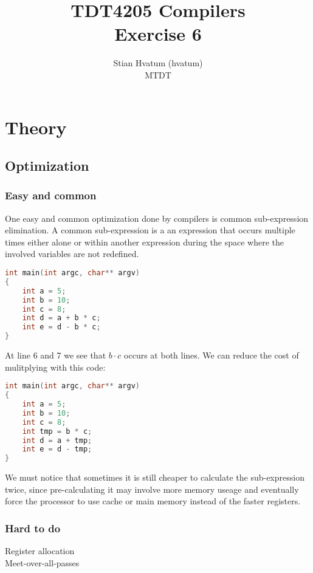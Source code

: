 \documentclass[english,a4paper]{scrartcl}
\title{TDT4205 Compilers\\
\Huge Exercise 6}
\author{Stian Hvatum (hvatum)\\MTDT}
\begin{document}
\maketitle
\tableofcontents
\newpage
\section{Theory}
\subsection{Optimization}
\subsubsection{Easy and common}
One easy and common optimization done by compilers is common sub-expression
elimination. A common sub-expression is a an expression that occurs multiple
times either alone or within another expression during the space where the
involved variables are not redefined.

\begin{lstlisting}[language=C]
int main(int argc, char** argv)
{
    int a = 5;
    int b = 10;
    int c = 8;
    int d = a + b * c;
    int e = d - b * c;
}
\end{lstlisting}

At line 6 and 7 we see that \(b \cdot c\) occurs at both lines. We can reduce
the cost of mulitplying with this code:
\begin{lstlisting}[language=C]
int main(int argc, char** argv)
{
    int a = 5;
    int b = 10;
    int c = 8;
    int tmp = b * c;
    int d = a + tmp;
    int e = d - tmp;
}
\end{lstlisting}

We must notice that sometimes it is still cheaper to calculate the
sub-expression twice, since pre-calculating it may involve more memory useage
and eventually force the processor to use cache or main memory instead of
the faster registers.

\subsubsection{Hard to do}
Register allocation\\Meet-over-all-passes
\end{document}
